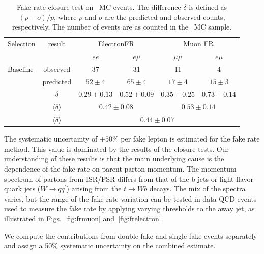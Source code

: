 \begin{table}[h]
\begin{center}
\begin{tabular}{lc|cc|cc}
\hline\hline
Selection	& result	&	\multicolumn{2}{|c}{ElectronFR}		& \multicolumn{2}{|c}{Muon FR}	\\
		&				&	$ee$		& $e\mu$		& $\mu\mu$	& $e\mu$	\\\hline
Baseline	&	observed		& 37			& 31			& 11		& 4		\\
		&predicted			& $52\pm4$		& $65\pm4$		& $17\pm 4$	& $15\pm3$	\\ 
		& $\delta$			& $0.29\pm 0.13$	& $0.52\pm0.09$		& $0.35\pm0.25$	& $0.73\pm0.14$	\\ 
		& $\langle \delta \rangle$	& \multicolumn{2}{|c}{$0.42\pm0.08$}		& \multicolumn{2}{|c}{$0.53\pm0.14$} \\
		& $\langle \delta \rangle$	& 		\multicolumn{4}{|c}{$0.44\pm 0.07$}				\\ \hline
\hline
\end{tabular}
\caption{\label{tab:ttclosure}Fake rate closure test on \ttbar\ MC events.
The difference $\delta$ is defined as $(p-o)/p$, where $p$ and $o$ are the predicted
and observed counts, respectively.
The number of events are as counted in the \ttbar\ MC sample.}
\end{center}
\end{table}

\newcommand{\nNoNu}{\ensuremath{N_{{n}\overline{n}}}}
\newcommand{\nNoNo}{\ensuremath{N_{\overline{n}\overline{n}}}}
\newcommand{\nNuNu}{\ensuremath{N_{{n}{n}}}}

The systematic uncertainty of $\pm 50\%$ per fake lepton is estimated for the fake rate method.
This value is dominated by the results of the closure tests.
Our understanding of these results is that the main underlying cause is 
the dependence of the fake rate on parent parton momentum.
The momentum spectrum of partons from ISR/FSR differs from that of the b-jets
or light-flavor-quark jets ($W\to q\bar{q}^\prime$) arising from the $t\to W b$ decays.
The mix of the spectra varies, but the range of the fake rate variation
can be tested in data QCD events used to measure the fake rate
by applying varying thresholds to the away jet, as illustrated in Figs.~\ref{fig:frmuon} and~\ref{fig:frelectron}.

We compute the contributions from double-fake and single-fake events separately and assign a 50\% systematic
uncertainty on the combined estimate.

